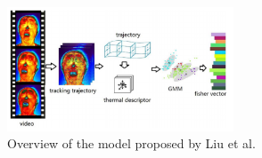 \begin{figure}[H]	\includegraphics[width=0.6\textwidth]{images/thermal.png} 
    \centering

\caption{
Overview of the model proposed by Liu et al. \cite{LiuSPONTANEOUSDESCRIPTOR}
} 

\label{fig:thermal}
\end{figure}